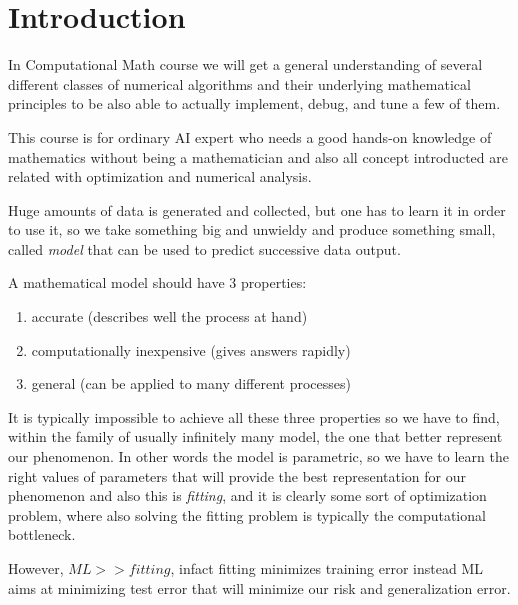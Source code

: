 \chapter{Introduction}
In Computational Math course we will get a general understanding of several different classes of
numerical algorithms and their underlying mathematical principles to be also able to actually
implement, debug, and tune a few of them.

This course is for ordinary AI expert who needs a good hands-on knowledge of mathematics without being a mathematician
and also all concept introducted are related with optimization and numerical analysis.

Huge amounts of data is generated and collected, but one has to learn it in order to use it, so we
take something big and unwieldy and produce something small, called \emph{model} that can be used
to predict successive data output.

A mathematical model should have 3 properties:
\begin{enumerate}
    \item accurate (describes well the process at hand)
    \item computationally inexpensive (gives answers rapidly)
    \item general (can be applied to many different processes)
\end{enumerate}
It is typically impossible to achieve all these three properties so we have to find, within the family of usually
infinitely many model, the one that better represent our phenomenon.\newline
In other words the model is parametric, so we have to learn the right values of parameters that will provide
the best representation for our phenomenon and also this is \emph{fitting}, and it is clearly
some sort of optimization problem, where also solving the fitting problem is typically the computational bottleneck.

However, $ML >> fitting$, infact fitting minimizes training error instead ML aims at minimizing test error 
that will minimize our risk and generalization error.



